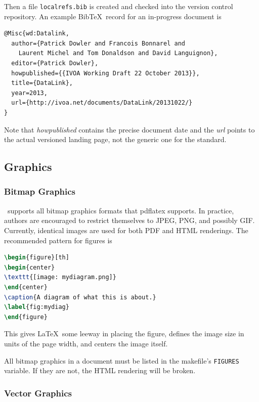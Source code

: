 \documentclass[11pt,a4paper]{ivoa}
\newcommand{\BibTeX}{BibTeX}
\begin{document}
Then a file \texttt{localrefs.bib} is created and checked into the
version control repository.  An example \BibTeX\ record for an
in-progress document is

\begin{lstlisting}
@Misc{wd:Datalink,
  author={Patrick Dowler and Francois Bonnarel and 
    Laurent Michel and Tom Donaldson and David Languignon},
  editor={Patrick Dowler},
  howpublished={{IVOA Working Draft 22 October 2013}},
  title={DataLink},
  year=2013,
  url={http://ivoa.net/documents/DataLink/20131022/}
}
\end{lstlisting}

Note that \emph{howpublished} contains the precise document date and the
\emph{url} points to the actual versioned landing page, not the generic
one for the standard.

\subsection{Graphics}

\subsubsection{Bitmap Graphics}

\ivoatex\ supports all bitmap graphics formats that pdflatex supports.
In practice, authors are encouraged to restrict themselves to JPEG, PNG,
and possibly GIF.  Currently, identical images are used for both PDF and
HTML renderings.  The recommended pattern for figures is
\begin{lstlisting}[language=tex]
\begin{figure}[th]
\begin{center}
\texttt{[image: mydiagram.png]}
\end{center}
\caption{A diagram of what this is about.}
\label{fig:mydiag}
\end{figure}
\end{lstlisting}
This gives \LaTeX\ some leeway in placing the figure, defines the image
size in units of the page width, and centers the image itself.

All bitmap graphics in a document must  be listed in the makefile's
\texttt{FIGURES} variable.  If they are not, the HTML rendering will be
broken.

\subsubsection{Vector Graphics}
\label{sect:vectorgraphics}
\end{document}
